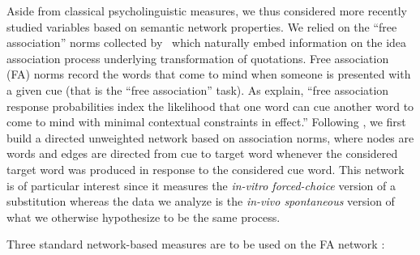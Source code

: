 \medskip
Aside from classical psycholinguistic measures, we thus considered more recently studied variables based on semantic network properties.
We relied on the ``free association'' norms collected by~\citet{Nelson04} which naturally embed information on the idea association process underlying transformation of quotations. Free association (FA) norms record the words that come to mind when someone is presented with a given cue (that is the ``free association'' task). As \citet{Nelson04} explain, ``free association response probabilities index the likelihood that one word can cue another word to come to mind with minimal contextual constraints in effect.''
Following \citet{Griffiths07}, we first build a directed unweighted network based on association norms, where nodes are words and edges are directed from cue to target word whenever the considered target word was produced in response to the considered cue word.
This network is of particular interest since it measures the \emph{in-vitro forced-choice} version of a substitution whereas the data we analyze is the \emph{in-vivo spontaneous} version of what we otherwise hypothesize to be the same process.

Three standard network-based measures are to be used on the FA network%
:

